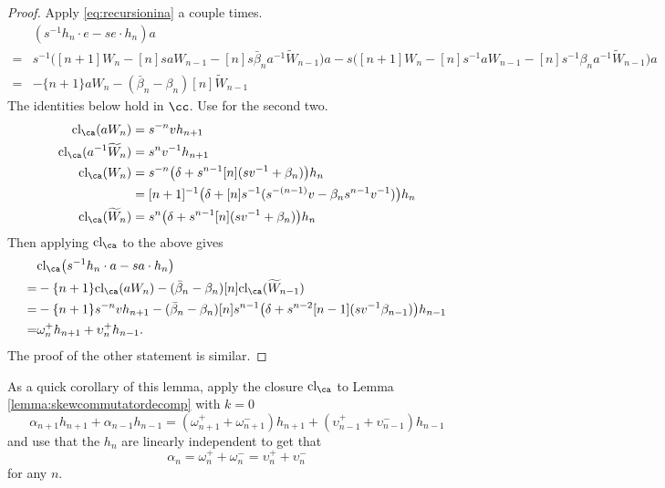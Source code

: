 \begin{proof}
Apply \eqref{eq:recursionina} a couple times.
\begin{align*}
& ( s^{-1} h_n \cdot e - s e \cdot h_n ) a \\
=&  s^{-1} \big( [n+1] W_n - [n] s a W_{n-1} - [n] s \bar{\beta}_n a^{-1} \widetilde{W}_{n-1} \big) a - s \big( [n+1] W_n - [n] s^{-1} a W_{n-1} - [n] s^{-1} \beta_n a^{-1} \widetilde{W}_{n-1} \big) a \\
=& - \{n+1\} a W_n - ( \bar{\beta}_n - \beta_n ) [n] \widetilde{W}_{n-1}
\end{align*}
The identities below hold in $\cc$. Use \cite[Lemma 21]{She16} for the second two.
\begin{align*}
\textrm{cl}_\ca ( a W_n ) &= s^{-n} v h_{n+1} \\
\textrm{cl}_\ca ( a^{-1} \widetilde{W}_n ) &= s^n v^{-1} h_{n+1} \\
\textrm{cl}_\ca ( W_n ) &= s^{-n} \big( \delta + s^{n-1} [n] ( s v^{-1} + \beta_n ) \big) h_n \\
&= [n+1]^{-1} \big( \delta + [n]s^{-1} ( s^{-(n-1)} v - \beta_n s^{n-1} v^{-1} ) \big) h_n \\
\textrm{cl}_\ca ( \widetilde{W}_n ) &= s^n \big( \delta + s^{n-1} [n] ( s v^{-1} + \beta_n ) \big) h_n
\end{align*}
Then applying $\textrm{cl}_\ca$ to the above gives
\begin{align*} 
& \textrm{cl}_\ca \big( s^{-1} h_n \cdot a - s a \cdot h_n \big) \\
=& - \{n+1\} \textrm{cl}_\ca ( a W_n ) - ( \bar{\beta}_n - \beta_n ) [n] \textrm{cl}_\ca ( \widetilde{W}_{n-1} ) \\
= & - \{n+1\} s^{-n} v h_{n+1} - ( \bar{\beta}_n - \beta_n ) [n] s^{n-1} \big( \delta + s^{n-2} [n-1] ( s v^{-1} \beta_{n-1} ) \big) h_{n-1} \\
= & \omega_n^+ h_{n+1} + \upsilon_n^+ h_{n-1}.
\end{align*}
The proof of the other statement is similar. 
\end{proof}

\begin{remark}
As a quick corollary of this lemma, apply the closure $\textrm{cl}_\ca$ to Lemma \ref{lemma:skewcommutatordecomp} with $k=0$ 
\[
\alpha_{n+1} h_{n+1} + \alpha_{n-1} h_{n-1} = ( \omega^+_{n+1} + \omega^-_{n+1} ) h_{n+1} + ( \upsilon^+_{n-1} + \upsilon^-_{n-1} ) h_{n-1}
\]
and use that the $h_n$ are linearly independent to get that 
\[
\alpha_n = \omega_n^+ + \omega_n^- = \upsilon_n^+ + \upsilon_n^-
\]
for any $n$. 
\end{remark}

